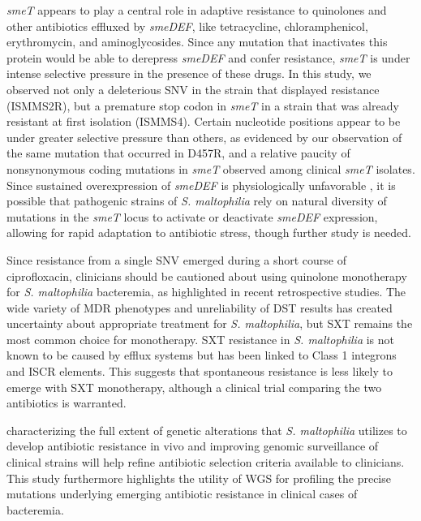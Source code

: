\emph{smeT} appears to play a central role in adaptive resistance to quinolones and other antibiotics effluxed by \emph{smeDEF}, like tetracycline, chloramphenicol, erythromycin, and aminoglycosides. Since any mutation that inactivates this protein would be able to derepress \emph{smeDEF} and confer resistance, \emph{smeT} is under intense selective pressure in the presence of these drugs. In this study, we observed not only a deleterious SNV in the strain that displayed resistance (ISMMS2R), but a premature stop codon in \emph{smeT} in a strain that was already resistant at first isolation (ISMMS4). Certain nucleotide positions appear to be under greater selective pressure than others, as evidenced by our observation of the same mutation that occurred in D457R, and a relative paucity of nonsynonymous coding mutations in \emph{smeT} observed among clinical \emph{smeT} isolates.\autocite{Sanchez2004} Since sustained overexpression of \emph{smeDEF} is physiologically unfavorable \autocite{Alonso2004}, it is possible that pathogenic strains of \emph{S. maltophilia} rely on natural diversity of mutations in the \emph{smeT} locus to activate or deactivate \emph{smeDEF} expression, allowing for rapid adaptation to antibiotic stress, though further study is needed.

Since resistance from a single SNV emerged during a short course of ciprofloxacin, clinicians should be cautioned about using quinolone monotherapy for \emph{S. maltophilia} bacteremia, as highlighted in recent retrospective studies.\autocite{Cho2014a,Wang2014} The wide variety of MDR phenotypes and unreliability of DST results has created uncertainty about appropriate treatment for \emph{S. maltophilia}, but SXT remains the most common choice for monotherapy.\autocite{Brooke2012,Cho2014a,Wang2014} SXT resistance in \emph{S. maltophilia} is not known to be caused by efflux systems but has been linked to Class 1 integrons and ISCR elements.\autocite{Brooke2012} This suggests that spontaneous resistance is less likely to emerge with SXT monotherapy, although a clinical trial comparing the two antibiotics is warranted.\autocite{Cho2014a,Wang2014}

 characterizing the full extent of genetic alterations that \emph{S. maltophilia} utilizes to develop antibiotic resistance in vivo and improving genomic surveillance of clinical strains will help refine antibiotic selection criteria available to clinicians. This study furthermore highlights the utility of WGS for profiling the precise mutations underlying emerging antibiotic resistance in clinical cases of bacteremia.

